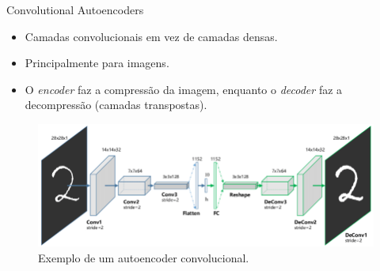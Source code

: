 \documentclass[dvipsnames]{beamer}
\begin{document}
\begin{frame}{Convolutional Autoencoders}

	\begin{itemize}
		\item Camadas convolucionais em vez de camadas densas.
		\item Principalmente para imagens.
		\item O \emph{encoder} faz a compressão da imagem, enquanto o \emph{decoder} faz a decompressão (camadas transpostas).
	\end{itemize}

    \begin{figure}
        \centering
        \includegraphics[scale=0.33]{img/conv-autoencoder.png} 
        \caption{Exemplo de um autoencoder convolucional.}
    \end{figure}

\end{frame}
\end{document}
